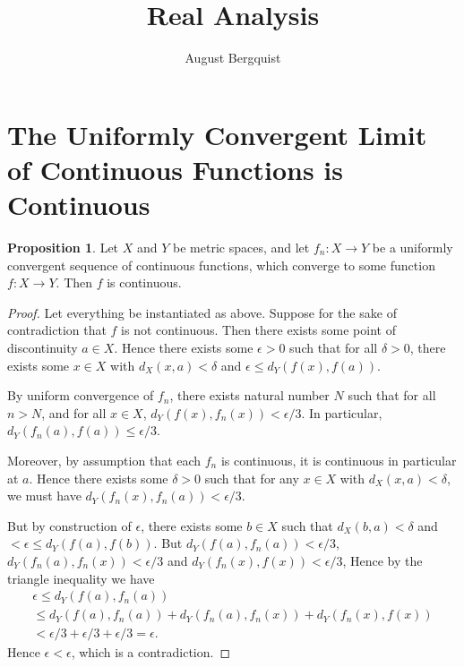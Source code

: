\documentclass[12pt]{article}
\title{Real Analysis}
\author{August Bergquist}
\theoremstyle{definition}
\newtheorem{proposition}{Proposition}
\begin{document}
\maketitle

\section{The Uniformly Convergent Limit of Continuous Functions is Continuous}

\begin{proposition} Let $X$ and $Y$ be metric spaces, and let $f_n:X\to Y$ be a uniformly convergent sequence of continuous functions, which converge 
to some function $ f:X\to Y $. Then $f$ is continuous.
\end{proposition}

\begin{proof} 

Let everything be instantiated as above. Suppose for the sake of contradiction that $f$ is not continuous. Then there exists some point of discontinuity 
$a\in X$. Hence there exists some $\epsilon > 0$ such that for all $\delta > 0$, there exists some $ x\in X $ with $ d_X(x,a) <\delta$ and
$\epsilon \le d_Y(f(x), f(a))$. 

By uniform convergence of $f_n$, there exists natural number $N$ such that for all $n> N$, and for all $x\in X$, $d_Y(f(x), f_n(x)) < \epsilon/3$. In 
particular, $ d_Y(f_n(a),f(a))\le \epsilon/3 $.

Moreover, by assumption that each $f_n$ is continuous, it is continuous in particular at $a$. Hence there exists some $\delta > 0$ such that for any $ 
x\in X$ with $d_X(x,a) <\delta$, we must have $ d_Y(f_n(x), f_n(a)) < \epsilon/3 $.

But by construction of $\epsilon$, there exists some $ b\in X $ such that $ d_X(b,a) < \delta $ and $ <\epsilon \le d_Y(f(a),f(b)) $. But $ d_Y(f(a), 
f_n(a)) < \epsilon/3$, $ d_Y(f_n(a), f_n(x)) < \epsilon/3 $ and $ d_Y(f_n(x), f(x)) < \epsilon/3 $, Hence by the triangle inequality we have 
\begin{equation}
    \begin{split}
        \epsilon \le d_Y(f(a), f_n(a)) \\
        \le d_Y(f(a), f_n(a)) + d_Y(f_n(a), f_n(x)) + d_Y(f_n(x), f(x))  \\
        < \epsilon/3 + \epsilon/3 + \epsilon/3 =\epsilon.
    \end{split}
\end{equation}
 Hence $\epsilon < \epsilon$, which is a contradiction. \end{proof}
\end{document}
